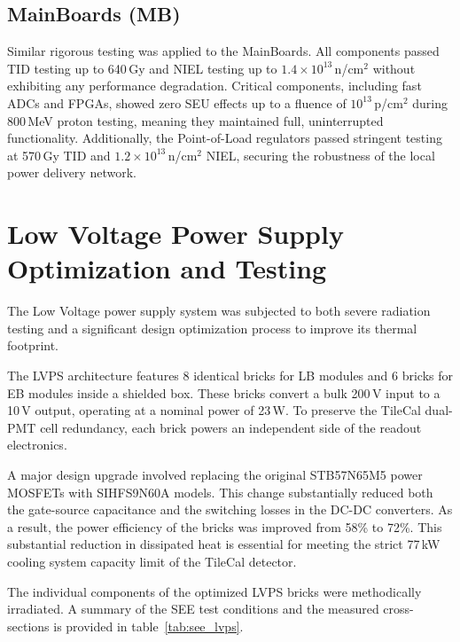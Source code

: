\documentclass[a4paper,11pt]{article}
\begin{document}
\subsection{MainBoards (MB)}

Similar rigorous testing was applied to the MainBoards. All components passed TID testing up to 640\,Gy and NIEL testing up to $1.4 \times 10^{13}$\,n/cm$^2$ without exhibiting any performance degradation. Critical components, including fast ADCs and FPGAs, showed zero SEU effects up to a fluence of $10^{13}$\,p/cm$^2$ during 800\,MeV proton testing, meaning they maintained full, uninterrupted functionality. Additionally, the Point-of-Load regulators passed stringent testing at 570\,Gy TID and $1.2 \times 10^{13}$\,n/cm$^2$ NIEL, securing the robustness of the local power delivery network.

\section{Low Voltage Power Supply Optimization and Testing}
\label{sec:lvps}

The Low Voltage power supply system was subjected to both severe radiation testing and a significant design optimization process to improve its thermal footprint.

The LVPS architecture features 8 identical bricks for LB modules and 6 bricks for EB modules inside a shielded box. These bricks convert a bulk 200\,V input to a 10\,V output, operating at a nominal power of 23\,W. To preserve the TileCal dual-PMT cell redundancy, each brick powers an independent side of the readout electronics. 

A major design upgrade involved replacing the original STB57N65M5 power MOSFETs with SIHFS9N60A models. This change substantially reduced both the gate-source capacitance and the switching losses in the DC-DC converters. As a result, the power efficiency of the bricks was improved from 58\% to 72\%. This substantial reduction in dissipated heat is essential for meeting the strict 77\,kW cooling system capacity limit of the TileCal detector.

The individual components of the optimized LVPS bricks were methodically irradiated. A summary of the SEE test conditions and the measured cross-sections is provided in table~\ref{tab:see_lvps}. 
\end{document}
